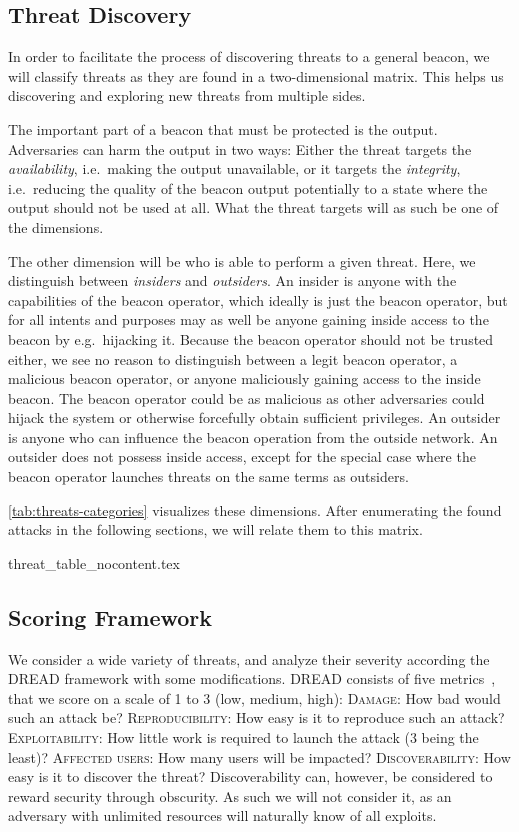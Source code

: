 \subsection{Threat Discovery}
In order to facilitate the process of discovering threats to a general beacon, we will classify threats as they are found in a two-dimensional matrix. This helps us discovering and exploring new threats from multiple sides.

The important part of a beacon that must be protected is the output. Adversaries can harm the output in two ways: Either the threat targets the \emph{availability}, i.e.\ making the output unavailable, or it targets the \emph{integrity}, i.e.\ reducing the quality of the beacon output potentially to a state where the output should not be used at all. What the threat targets will as such be one of the dimensions.

The other dimension will be who is able to perform a given threat.
Here, we distinguish between \emph{insiders} and \emph{outsiders}.
An insider is anyone with the capabilities of the beacon operator, which ideally is just the beacon operator, but for all intents and purposes may as well be anyone gaining inside access to the beacon by e.g.\ hijacking it.
Because the beacon operator should not be trusted either, we see no reason to distinguish between a legit beacon operator, a malicious beacon operator, or anyone maliciously gaining access to the inside beacon.
The beacon operator could be as malicious as other adversaries could hijack the system or otherwise forcefully obtain sufficient privileges.
An outsider is anyone who can influence the beacon operation from the outside network.
An outsider does not possess inside access, except for the special case where the beacon operator launches threats on the same terms as outsiders.

\cref{tab:threats-categories} visualizes these dimensions. After enumerating the found attacks in the following sections, we will relate them to this matrix.

{threat_table_nocontent.tex}

\subsection{Scoring Framework}
We consider a wide variety of threats, and analyze their severity according the DREAD framework with some modifications. DREAD consists of five metrics~\cite{dread}, that we score on a scale of 1 to 3 (low, medium, high):
\textsc{Damage}: How bad would such an attack be?
\textsc{Reproducibility}: How easy is it to reproduce such an attack?
\textsc{Exploitability}: How little work is required to launch the attack (3 being the least)?
\textsc{Affected users}: How many users will be impacted?
\textsc{Discoverability}: How easy is it to discover the threat?
Discoverability can, however, be considered to reward security through obscurity. As such we will not consider it, as an adversary with unlimited resources will naturally know of all exploits.

